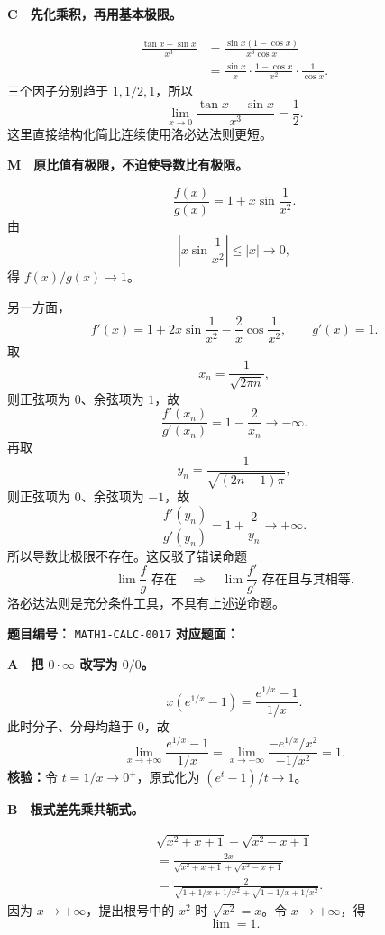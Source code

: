\begin{solutionBox}
\textbf{C　先化乘积，再用基本极限。}

\[
\begin{aligned}
\frac{\tan x-\sin x}{x^3}
&=\frac{\sin x(1-\cos x)}{x^3\cos x}\\
&=\frac{\sin x}{x}\cdot
  \frac{1-\cos x}{x^2}\cdot
  \frac1{\cos x}.
\end{aligned}
\]
三个因子分别趋于 \(1,1/2,1\)，所以
\[
\boxed{\lim_{x\to0}\frac{\tan x-\sin x}{x^3}=\frac12}.
\]
这里直接结构化简比连续使用洛必达法则更短。
\end{solutionBox}

\begin{solutionBox}
\textbf{M　原比值有极限，不迫使导数比有极限。}

\[
\frac{f(x)}{g(x)}
=1+x\sin\frac1{x^2}.
\]
由
\[
\left|x\sin\frac1{x^2}\right|\le |x|\to0,
\]
得 \(f(x)/g(x)\to1\)。

另一方面，
\[
f'(x)
=1+2x\sin\frac1{x^2}
-\frac2x\cos\frac1{x^2},
\qquad g'(x)=1.
\]
取
\[
x_n=\frac1{\sqrt{2\pi n}},
\]
则正弦项为 \(0\)、余弦项为 \(1\)，故
\[
\frac{f'(x_n)}{g'(x_n)}=1-\frac2{x_n}\to-\infty.
\]
再取
\[
y_n=\frac1{\sqrt{(2n+1)\pi}},
\]
则正弦项为 \(0\)、余弦项为 \(-1\)，故
\[
\frac{f'(y_n)}{g'(y_n)}=1+\frac2{y_n}\to+\infty.
\]
所以导数比极限不存在。这反驳了错误命题
\[
\lim\frac fg\text{ 存在}
\quad\Longrightarrow\quad
\lim\frac{f'}{g'}\text{ 存在且与其相等}.
\]
洛必达法则是充分条件工具，不具有上述逆命题。
\end{solutionBox}

\begin{problemMeta}
\textbf{题目编号：} \texttt{MATH1-CALC-0017}\quad
\textbf{对应题面：} 
\end{problemMeta}

\begin{solutionBox}
\textbf{A　把 \(0\cdot\infty\) 改写为 \(0/0\)。}

\[
x\left(e^{1/x}-1\right)
=\frac{e^{1/x}-1}{1/x}.
\]
此时分子、分母均趋于 \(0\)，故
\[
\lim_{x\to+\infty}
\frac{e^{1/x}-1}{1/x}
=
\lim_{x\to+\infty}
\frac{-e^{1/x}/x^2}{-1/x^2}
=1.
\]
\textbf{核验：}令 \(t=1/x\to0^+\)，原式化为
\((e^t-1)/t\to1\)。
\end{solutionBox}

\begin{solutionBox}
\textbf{B　根式差先乘共轭式。}

\[
\begin{aligned}
&\sqrt{x^2+x+1}-\sqrt{x^2-x+1}\\
&=\frac{2x}
{\sqrt{x^2+x+1}+\sqrt{x^2-x+1}}\\
&=\frac{2}
{\sqrt{1+1/x+1/x^2}+\sqrt{1-1/x+1/x^2}}.
\end{aligned}
\]
因为 \(x\to+\infty\)，提出根号中的 \(x^2\) 时
\(\sqrt{x^2}=x\)。令 \(x\to+\infty\)，得
\[
\boxed{\lim=1}.
\]
\end{solutionBox}

